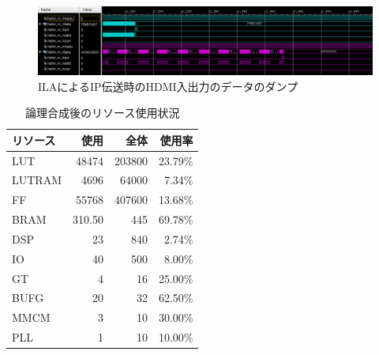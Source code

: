 
\begin{figure}[htbp]
  \begin{center}
    \includegraphics[bb=0 0 1199 246,width=22.5cm,angle=270]{img/fpga-ila-hdmi.png}
  \end{center}
  \caption{ILAによるIP伝送時のHDMI入出力のデータのダンプ}
  \label{fig:fpga-ila-hdmi}
\end{figure}


\begin{table}[htbp]
  \caption{論理合成後のリソース使用状況}
  \label{tb:fpga-post-implementation-utilization}
  \begin{center}
  \begin{tabular}{l|r|r|r}
    \hline
    リソース  & 使用    & 全体    & 使用率   \\\hline\hline
    LUT      &  48474 & 203800 & 23.79\% \\\hline
    LUTRAM   &   4696 &  64000 &  7.34\% \\\hline
    FF       &  55768 & 407600 & 13.68\% \\\hline
    BRAM     & 310.50 &    445 & 69.78\% \\\hline
    DSP      &     23 &    840 &  2.74\% \\\hline
    IO       &     40 &    500 &  8.00\% \\\hline
    GT       &      4 &     16 & 25.00\% \\\hline
    BUFG     &     20 &     32 & 62.50\% \\\hline
    MMCM     &      3 &     10 & 30.00\% \\\hline
    PLL      &      1 &     10 & 10.00\% \\\hline
  \end{tabular}\end{center}
\end{table}
